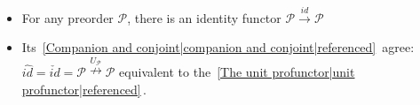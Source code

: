 
\begin{itemize}
    \item For any preorder $\mathcal{P}$, there is an identity functor $\mathcal{P}\xrightarrow{id}\mathcal{P}$
    \item Its \,\ref{Companion and conjoint|companion and conjoint|referenced}\, agree: $\hat{id}=\check{id}=\mathcal{P}\overset{U_\mathcal{P}}\nrightarrow \mathcal{P}$ equivalent to the \,\ref{The unit profunctor|unit profunctor|referenced}\,.
  \end{itemize}
